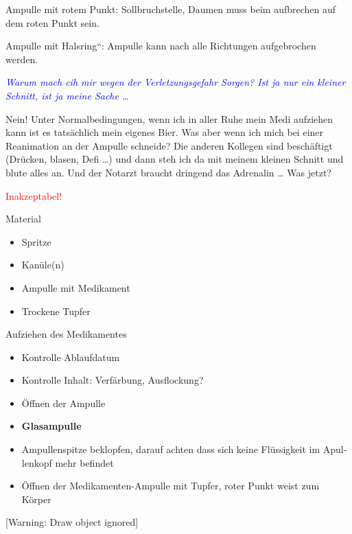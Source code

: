 \documentclass{article}
\newcommand\gH[1]{\textmd{\textcolor[rgb]{0.0,0.0,0.5019608}{#1}}}
\begin{document}
{\mdseries
Ampulle mit rotem Punkt: Sollbruchstelle, Daumen muss beim aufbrechen
auf dem roten Punkt sein. }

{\mdseries
Ampulle mit {\quotedblbase}Halsring{\textquotedblleft}: Ampulle kann
nach alle Richtungen aufgebrochen werden. }

\begin{center}
\begin{minipage}{6.556cm}
{\mdseries
\gH{\textit{\textcolor{blue}{Warum
mach{\textquotesingle} cih mir wegen der Verletzungsgefahr Sorgen? Ist
ja nur ein kleiner Schnitt, ist ja meine Sache {\dots}}}}}

\gH{Nein! Unter Normalbedingungen, wenn ich in aller
Ruhe mein Medi aufziehen kann ist es tats\"achlich mein eigenes Bier.
Was aber wenn ich mich bei einer Reanimation an der Ampulle schneide?
Die anderen Kollegen sind besch\"aftigt (Dr\"ucken, blasen, Defi
{\dots}) und dann steh ich da mit meinem kleinen Schnitt und
}\gH{blute alles an}\gH{. Und der
Notarzt braucht dringend das Adrenalin {\dots} Was jetzt?}

{\centering
\gH{\textcolor{red}{Inakzeptabel!}}
\par}

\end{minipage}
\end{center}
{\mdseries\color{black}
Material }

\begin{itemize}
\item {\mdseries
Spritze}

\item {\mdseries
Kan\"ule(n)}

\item {\mdseries
Ampulle mit Medikament}

\item {\mdseries
Trockene Tupfer}

\end{itemize}
{\mdseries\color{black}
Aufziehen des Medikamentes}

\begin{itemize}
\item {\mdseries
Kontrolle Ablaufdatum}

\item {\mdseries
Kontrolle Inhalt: Verf\"arbung, Ausflockung?}

\item {\mdseries
\"Offnen der Ampulle}

\end{itemize}
\begin{itemize}
\item {\mdseries
 \textbf{Glasampulle}}

\end{itemize}
\begin{itemize}
\item {\mdseries
Ampullenspitze beklopfen\foreignlanguage{ngerman}{, darauf achten dass
sich keine Fl\"ussigkeit im Apullenkopf mehr befindet}}

\item {\mdseries
\"Offnen der Medikamenten-Ampulle mit Tupfer, roter Punkt weist zum
K\"orper}

\end{itemize}
[Warning: Draw object ignored]
\end{document}
